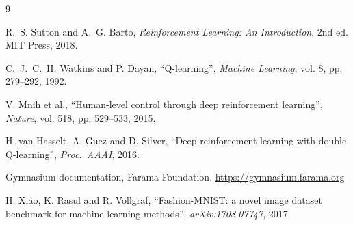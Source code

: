 \documentclass[11pt,a4paper]{article}
\begin{document}
\begin{thebibliography}{9}

R.~S. Sutton and A.~G. Barto, \emph{Reinforcement Learning: An Introduction}, 2nd ed. MIT Press, 2018.

C.~J.~C.~H. Watkins and P. Dayan, ``Q-learning'', \emph{Machine Learning}, vol. 8, pp. 279--292, 1992.

V. Mnih et al., ``Human-level control through deep reinforcement learning'', \emph{Nature}, vol. 518, pp. 529--533, 2015.

H. van Hasselt, A. Guez and D. Silver, ``Deep reinforcement learning with double Q-learning'', \emph{Proc.\ AAAI}, 2016.

Gymnasium documentation, Farama Foundation. \url{https://gymnasium.farama.org}

H. Xiao, K. Rasul and R. Vollgraf, ``Fashion-MNIST: a novel image dataset benchmark for machine learning methods'', \emph{arXiv:1708.07747}, 2017.

\end{thebibliography}
\end{document}
